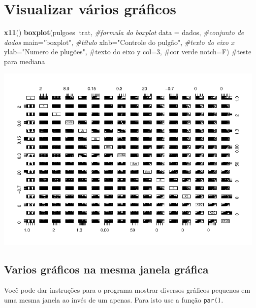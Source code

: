 \documentclass[
]{book}
\newenvironment{Shaded}{\begin{snugshade}}{\end{snugshade}}
\newcommand{\CommentTok}[1]{\textcolor[rgb]{0.56,0.35,0.01}{\textit{#1}}}
\newcommand{\DataTypeTok}[1]{\textcolor[rgb]{0.13,0.29,0.53}{#1}}
\newcommand{\KeywordTok}[1]{\textcolor[rgb]{0.13,0.29,0.53}{\textbf{#1}}}
\newcommand{\NormalTok}[1]{#1}
\newcommand{\OperatorTok}[1]{\textcolor[rgb]{0.81,0.36,0.00}{\textbf{#1}}}
\newcommand{\StringTok}[1]{\textcolor[rgb]{0.31,0.60,0.02}{#1}}
\begin{document}
\hypertarget{visualizar-vuxe1rios-gruxe1ficos}{%
\section{Visualizar vários gráficos}\label{visualizar-vuxe1rios-gruxe1ficos}}

\begin{Shaded}
\begin{Highlighting}[]
\KeywordTok{x11}\NormalTok{()}
\KeywordTok{boxplot}\NormalTok{(pulgoes}\OperatorTok{~}\NormalTok{trat,              }\CommentTok{#formula do boxplot}
        \DataTypeTok{data =}\NormalTok{ dados,              }\CommentTok{#conjunto de dados}
        \DataTypeTok{main=}\StringTok{"boxplot"}\NormalTok{,            }\CommentTok{#título}
        \DataTypeTok{xlab=}\StringTok{"Controle do pulgão"}\NormalTok{, }\CommentTok{#texto do eixo x }
        \DataTypeTok{ylab=}\StringTok{"Numero de plugões",  #texto do eixo y}
\StringTok{        col=3,                     #cor verde  }
\StringTok{        notch=F)                   #teste para mediana}
\end{Highlighting}
\end{Shaded}

\includegraphics{TudodoR_files/figure-latex/unnamed-chunk-181-1.pdf}

\hypertarget{varios-gruxe1ficos-na-mesma-janela-gruxe1fica}{%
\subsection{Varios gráficos na mesma janela gráfica}\label{varios-gruxe1ficos-na-mesma-janela-gruxe1fica}}

Você pode dar instruções para o programa mostrar diversos gráficos pequenos em uma mesma janela ao invés de um apenas. Para isto use a função \texttt{par()}.
\end{document}
